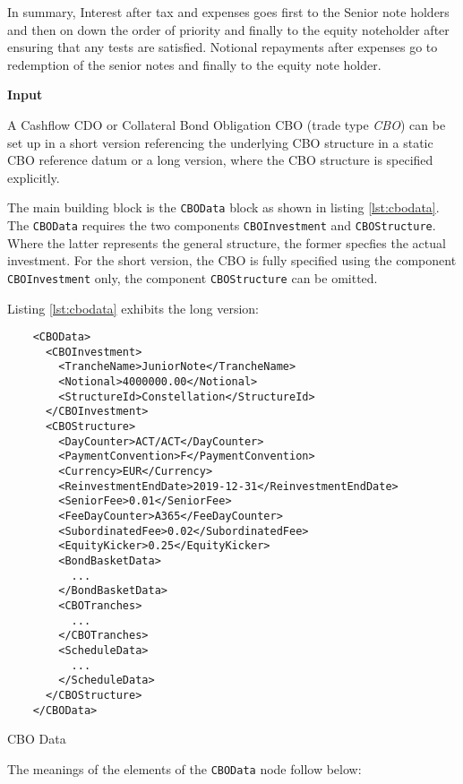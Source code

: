 {In summary, Interest after tax and expenses goes first to the Senior note holders and then on down the order of priority and finally 
to the equity noteholder after ensuring that any  tests are satisfied. Notional repayments after expenses go to redemption of the senior notes and finally to the equity note holder.

{\bf Input}}\fi

A Cashflow CDO or Collateral Bond Obligation CBO (trade type \emph{CBO}) can be set up in a short version 
referencing the underlying CBO structure in a static CBO reference datum or a long version, where the CBO structure is specified explicitly.

The main building block is the {\tt CBOData} block as shown in listing 
\ref{lst:cbodata}. The {\tt CBOData} requires the two components {\tt CBOInvestment} and {\tt CBOStructure}. 
Where the latter represents the general structure, the former specfies the actual investment. 
For the short version, the CBO is fully specified using the component {\tt CBOInvestment} only, 
the component {\tt CBOStructure} can be omitted. 

Listing \ref{lst:cbodata} exhibits the long version: 

\begin{listing}[H]
\begin{verbatim}
    <CBOData>
      <CBOInvestment>
        <TrancheName>JuniorNote</TrancheName>
        <Notional>4000000.00</Notional>
        <StructureId>Constellation</StructureId>
      </CBOInvestment>
      <CBOStructure>
        <DayCounter>ACT/ACT</DayCounter>
        <PaymentConvention>F</PaymentConvention>
        <Currency>EUR</Currency>
        <ReinvestmentEndDate>2019-12-31</ReinvestmentEndDate>
        <SeniorFee>0.01</SeniorFee>
        <FeeDayCounter>A365</FeeDayCounter>
        <SubordinatedFee>0.02</SubordinatedFee>
        <EquityKicker>0.25</EquityKicker>
        <BondBasketData>
          ...
        </BondBasketData>
        <CBOTranches>
          ...
        </CBOTranches>
        <ScheduleData>
          ...
        </ScheduleData>
      </CBOStructure>
    </CBOData>
\end{verbatim}
\caption{CBO Data}
\label{lst:cbodata}
\end{listing}

The meanings of the elements of the {\tt CBOData} node follow below:

